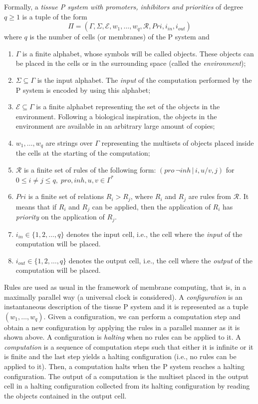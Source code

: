 \documentclass[journal]{IEEEtran}
\begin{document}
Formally, a \emph{tissue P system with promoters, inhibitors and
priorities} of degree $q\geq 1$ is a tuple of the form
$$
    \Pi=(\Gamma,\Sigma,\mathcal{E},w_1,\dots,w_q,\mathcal{R},Pri,i_{in},i_{out})
$$
where $q$ is the number of cells (or membranes) of the P system and
\begin{enumerate}
    \item $\Gamma$ is a finite alphabet, whose symbols will be called objects.
    These objects can be placed in the cells or in the surrounding space (called
    the {\it environment});
    \item $\Sigma\subseteq\Gamma$ is the input alphabet. The {\it input} of the
    computation performed by the P system is encoded by using this alphabet;
    \item $\mathcal{E}\subseteq \Gamma$ is a finite alphabet representing the set
    of the objects in the environment. Following a biological inspiration, the
    objects in the environment are available in an arbitrary large amount of
    copies;
    \item $w_1,\dots,w_q$ are strings over $\Gamma$ representing the multisets of
    objects placed inside the cells at the starting of the computation;
    \item $\mathcal{R}$ is a finite set of rules of the following form:
    $
    (pro\,\neg inh\,|\,i,u/v,j)
    $
    for 
    $
    0\leq i\neq j\leq q,\;pro,inh,u,v\in
    \Gamma^*
    $
    \item $Pri$ is a finite set of relations $R_i > R_j$, where $R_i$ and $R_j$
    are rules from $\mathcal{R}$. It means that if $R_i$ and $R_j$ can be applied,
    then the application of $R_i$ has {\it priority} on the application of $R_j$.
    \item $i_{in}\in \{1,2,\dots,q\}$ denotes the input cell, i.e., the cell where
    the {\it input} of the computation will be placed.
    \item $i_{out}\in \{1,2,\dots,q\}$ denotes the output cell, i.e., the cell
    where the {\it output} of the computation will be placed.
\end{enumerate}


Rules are used as usual in the framework of membrane computing, that is, in a
maximally parallel way (a universal clock is considered). A \emph{configuration}
is an instantaneous description of the tissue P system and it is represented as
a tuple $(w_1,\dots,w_q)$. Given a configuration, we can perform a computation
step and obtain a new configuration by applying the rules in a parallel manner
as it is shown above. A configuration is \emph{halting} when no rules can be
applied to it. A {\it computation} is a sequence of computation steps such that
either it is infinite or it is finite and the last step yields a halting
configuration (i.e., no rules can be applied to it). Then, a computation halts
when the P system reaches a halting configuration. The output of a computation
is the multiset placed in the output cell in a halting configuration collected
from its halting configuration by reading the objects contained in the output
cell.
\end{document}
